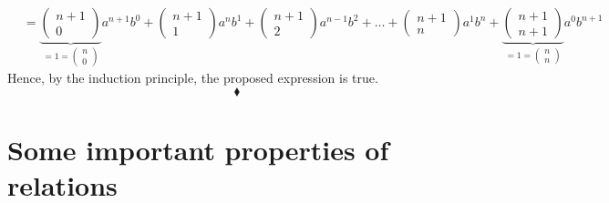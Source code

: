 \begin{align*}
&= \underbrace{\left(\begin{matrix}n+1\\ 0\end{matrix}\right)}_{=1=\left(\begin{matrix}n\\ 0\end{matrix}\right) }a^{n+1}b^{0}+\left(\begin{matrix}n+1\\ 1\end{matrix}\right)a^{n}b^{1}+\left(\begin{matrix}n+1\\ 2\end{matrix}\right)a^{n-1}b^{2}+\dots +\left(\begin{matrix}n+1\\n\end{matrix}\right)a^{1}b^{n}+ \underbrace{\left(\begin{matrix}n+1\\ n+1\end{matrix}\right)}_{= 1=\left(\begin{matrix}n\\ n\end{matrix}\right)}a^{0}b^{n+1}
\end{align*}
Hence, by the induction principle, the proposed expression is true.
$$\blacklozenge$$

\newpage

 \section{Some important properties of relations}
